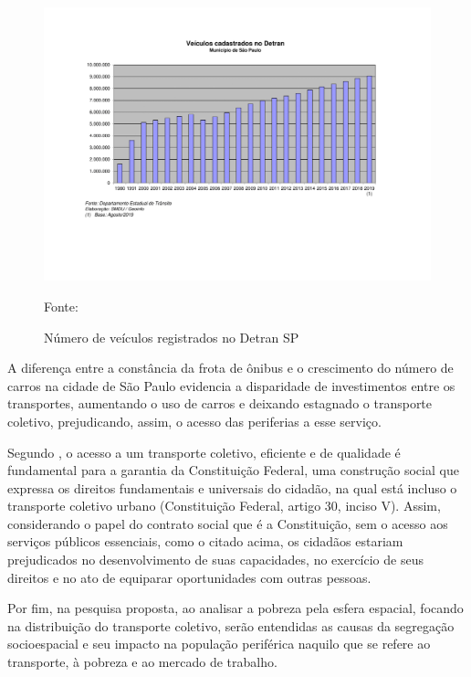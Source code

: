 \begin{figure}[!htbp]
	\centering
 	\caption{Número de veículos registrados no Detran SP}
	\includegraphics[scale=0.18]{introducao/veiculos.png}
	\begin{flushleft}
	    {\footnotesize Fonte: \cite{graficoVeiculos}}
	\end{flushleft}
	\label{fig:veiculos_detranSP}
\end{figure}

A diferença entre a constância da frota de ônibus e o crescimento do número de carros na cidade de São Paulo evidencia a disparidade de investimentos entre os transportes, aumentando o uso de carros e deixando estagnado o transporte coletivo, prejudicando, assim, o acesso das periferias a esse serviço.
	
Segundo \citeauthor{gomide2003transporte} \citeyear{gomide2003transporte}, o acesso a um transporte coletivo, eficiente e de qualidade é fundamental para a garantia da Constituição Federal, uma construção social que expressa os direitos fundamentais e universais do cidadão, na qual está incluso o transporte coletivo urbano \cite{constituicao} (Constituição Federal, artigo 30, inciso V). Assim, considerando o papel do contrato social que é a Constituição, sem o acesso aos serviços públicos essenciais, como o citado acima, os cidadãos estariam prejudicados no desenvolvimento de suas capacidades, no exercício de seus direitos e no ato de equiparar oportunidades com outras pessoas. 

Por fim, na pesquisa proposta, ao analisar a pobreza pela esfera espacial, focando na distribuição do transporte coletivo, serão entendidas as causas da segregação socioespacial e seu impacto na população periférica naquilo que se refere ao transporte, à pobreza e ao mercado de trabalho.
